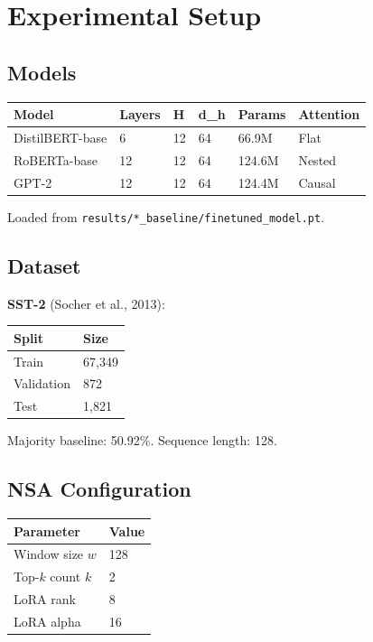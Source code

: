 
\section{Experimental Setup}

\subsection{Models}

\begin{table}[H]
\centering
\small
\begin{tabular}{llllll}
\toprule
\textbf{Model} & \textbf{Layers} & \textbf{H} & \textbf{d\_h} & \textbf{Params} & \textbf{Attention} \\
\midrule
DistilBERT-base & 6 & 12 & 64 & 66.9M & Flat \\
RoBERTa-base & 12 & 12 & 64 & 124.6M & Nested \\
GPT-2 & 12 & 12 & 64 & 124.4M & Causal \\
\bottomrule
\end{tabular}
\end{table}

Loaded from \texttt{results/*\_baseline/finetuned\_model.pt}.

\subsection{Dataset}

\textbf{SST-2} (Socher et al., 2013):

\begin{table}[H]
\centering
\small
\begin{tabular}{ll}
\toprule
\textbf{Split} & \textbf{Size} \\
\midrule
Train & 67,349 \\
Validation & 872 \\
Test & 1,821 \\
\bottomrule
\end{tabular}
\end{table}

Majority baseline: 50.92\%. Sequence length: 128.

\subsection{NSA Configuration}

\begin{table}[H]
\centering
\small
\begin{tabular}{ll}
\toprule
\textbf{Parameter} & \textbf{Value} \\
\midrule
Window size $w$ & 128 \\
Top-$k$ count $k$ & 2 \\
LoRA rank & 8 \\
LoRA alpha & 16 \\
\bottomrule
\end{tabular}
\end{table}

